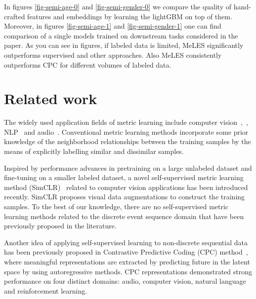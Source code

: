 \documentclass{article}
\begin{document}
In figures \ref{fig-semi-age-0} and \ref{fig-semi-gender-0} we compare the quality of hand-crafted features and embeddings by learning the lightGBM on top of them. Moreover, in figures \ref{fig-semi-age-1} and \ref{fig-semi-gender-1} one can find comparison of a single models trained on downstream tasks considered in the paper. As you can see in figures, if labeled data is limited, MeLES significantly outperforms supervised and other approaches. Also MeLES consistently outperforms CPC for different volumes of labeled data.

\section{Related work} \label{sec-rel-work}

The widely used application fields of metric learning include computer vision~\cite{Chopra2005LearningAS},~\cite{Schroff2015FaceNetAU},  NLP~\cite{Reimers2019SentenceBERTSE} and audio~\cite{Wan2018GeneralizedEL}. Conventional metric learning methods incorporate some prior knowledge of the neighborhood relationships between the training samples by the means of explicitly labelling similar and dissimilar samples.

Inspired by performance advances in pretraining on a large unlabeled dataset and fine-tuning on a smaller labeled dataset, a novel self-supervised metric learning method (SimCLR)~\cite{Chen2020ASF} related to computer vision applications has been introduced recently. SimCLR proposes visual data augmentations to construct the training samples. To the best of our knowledge, there are no self-supervised metric learning methods related to the discrete event sequence domain that have been previously proposed in the literature.

Another idea of applying self-supervised learning to non-discrete sequential data has been previously proposed in Contrastive Predictive Coding (CPC) method~\cite{Oord2018RepresentationLW}, where meaningful representations are extracted by predicting future in the latent space by using autoregressive methods. CPC representations demonstrated strong performance on four distinct domains: audio, computer vision, natural language and reinforcement learning. 
\end{document}
